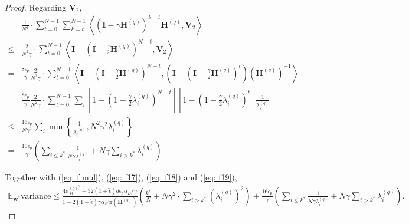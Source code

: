 \documentclass[11pt, letterpaper]{article}
\begin{document}
\begin{proof}
    Regarding $\mathbf{V}_2$,
    \begin{equation}
        \label{eq: f19}
        \begin{aligned}
            &\frac{1}{N^2}\cdot\sum_{t=0}^{N-1}\sum_{k=t}^{N-1}\left\langle(\mathbf{I}-\gamma\mathbf{H}^{(q)})^{k-t}\mathbf{H}^{(q)},\mathbf{V}_2\right\rangle\\
            \leq&\frac{2}{N^2\gamma}\cdot\sum_{t=0}^{N-1}\left\langle\mathbf{I}-(\mathbf{I}-\frac{\gamma}{2}\mathbf{H}^{(q)})^{N-t},\mathbf{V}_2\right\rangle\\
            =&\frac{8\epsilon_p}{\gamma}\frac{2}{N^2\gamma}\cdot\sum_{t=0}^{N-1}\left\langle\mathbf{I}-(\mathbf{I}-\frac{\gamma}{2}\mathbf{H}^{(q)})^{N-t},(\mathbf{I}-(\mathbf{I}-\frac{\gamma}{2} \mathbf{H}^{(q)})^{t})(\mathbf{H}^{(q)})^{-1}\right\rangle\\
            =&\frac{8\epsilon_p}{\gamma}\frac{2}{N^2\gamma}\cdot\sum_{t=0}^{N-1}\sum_i\left[1-(1-\frac{\gamma}{2}\lambda_i^{(q)})^{N-t}\right]\left[1-(1-\frac{\gamma}{2}\lambda_i^{(q)})^t\right]\frac{1}{\lambda_i^{(q)}}\\
            \leq&\frac{16\epsilon_p}{N\gamma^2}\sum_i\min\left\{ \frac{1}{\lambda_i^{(q)}}, N^2\gamma^2{\lambda_i^{(q)}}\right\}\\
            =&\frac{16\epsilon_p}{\gamma}\left(\sum_{i\leq k^*}\frac{1}{N\gamma\lambda_i^{(q)}}+N\gamma\sum_{i>k^*}\lambda_i^{(q)}\right).
        \end{aligned}
    \end{equation}
    
    Together with (\ref{eq: f mul}), (\ref{eq: f17}), (\ref{eq: f18}) and (\ref{eq: f19}),
    \begin{gather*}
        \mathbb{E}_{\mathbf{w}^*}\mathrm{variance}\leq \frac{4{\sigma_M^{(q)}}^2+32(1+\tilde{\epsilon}){d\epsilon_p}\alpha_B/\gamma}{1-2(1+\tilde{\epsilon})\gamma\alpha_B\mathrm{tr}(\mathbf{H}^{(q)})}\left(\frac{k^*}{N}+N\gamma^2\cdot\sum_{i>k^*}(\lambda_i^{(q)})^2\right)+\frac{16\epsilon_p}{\gamma}\left(\sum_{i\leq k^*}\frac{1}{N\gamma\lambda_i^{(q)}}+N\gamma\sum_{i>k^*}\lambda_i^{(q)}\right).
    \end{gather*}
\end{proof}
\end{document}
